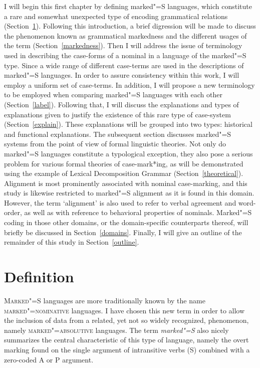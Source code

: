 I will begin this first chapter by defining marked"=S languages, which constitute a rare and somewhat unexpected type of encoding grammatical relations (Section~\ref{definition}). 
Following this introduction, a brief digression will be made to discuss the phenomenon known as grammatical markedness and the different usages of the term (Section~\ref{markedness}). 
Then I will address the issue of terminology used in describing the case-forms of a nominal in a language of the marked"=S type. 
Since a wide range of different case-terms are used in the descriptions of marked"=S languages. 
In order to assure consistency within this work, I will employ a uniform set of case-terms. 
In addition, I will propose a new terminology to be employed when comparing marked"=S languages with each other (Section~\ref{label}). 
Following that, I will discuss the explanations and types of explanations given to justify the existence of this rare type of case-system (Section~\ref{explain}). 
These explanations will be grouped into two types: historical and functional explanations.
The subsequent section discusses marked"=S systems from the point of view of formal linguistic theories. 
Not only do marked"=S languages constitute a typological exception, they also pose a serious problem for various formal theories of case-mark*ing, as will be demonstrated using the example of Lexical Decomposition Grammar (Section~\ref{theoretical}).
Alignment is most prominently associated with nominal case-marking, and this study is likewise restricted to marked"=S alignment as it is found in this domain. 
However, the term `alignment' is also used to refer to verbal agreement and word-order, as well as with reference to behavioral properties of nominals. 
Marked"=S coding in those other domains, or the domain-specific counterparts thereof, will briefly be discussed in Section~\ref{domains}.\enlargethispage{\baselineskip}
Finally, I will give an outline of the remainder of this study in Section~\ref{outline}.


\section{Definition}\label{definition}

\textsc{Marked"=S} languages are more traditionally known by the name \textsc{marked"=nominative} languages. 
I have chosen this new term in order to allow the inclusion of data from a related, yet not so widely recognized, phenomenon, namely \textsc{marked"=absolutive} languages. 
The term \textit{marked"=S} also nicely summarizes the central characteristic of this type of language, namely the overt marking found on the single argument of intransitive verbs (S) combined with a zero-coded A or P argument. 

